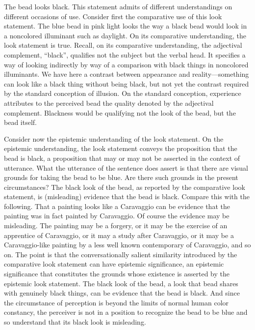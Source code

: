 \documentclass[12pt]{article}
\begin{document}

The bead looks black. This statement admits of different understandings on different occasions of use. Consider first the comparative use of this look statement. The blue bead in pink light looks the way a black bead would look in a noncolored illuminant such as daylight. On its comparative understanding, the look statement is true. Recall, on its comparative understanding, the adjectival complement, ``black'', qualifies not the subject but the verbal head. It specifies a way of looking indirectly by way of a comparison with black things in noncolored illuminants. We have here a contrast between appearance and reality---something can look like a black thing without being black, but not yet the contrast required by the standard conception of illusion. On the standard conception, experience attributes to the perceived bead the quality denoted by the adjectival complement. Blackness would be qualifying not the look of the bead, but the bead itself. 

Consider now the epistemic understanding of the look statement. On the epistemic understanding, the look statement conveys the proposition that the bead is black, a proposition that may or may not be asserted in the context of utterance. What the utterance of the sentence does assert is that there are visual grounds for taking the bead to be blue. Are there such grounds in the present circumstances? The black look of the bead, as reported by the comparative look statement, is (misleading) evidence that the bead is black. Compare this with the following. That a painting looks like a Caravaggio can be evidence that the painting was in fact painted by Caravaggio. Of course the evidence may be misleading. The painting may be a forgery, or it may be the exercise of an apprentice of Caravaggio, or it may a study after Caravaggio, or it may be a Caravaggio-like painting by a less well known contemporary of Caravaggio, and so on. The point is that the conversationally salient similarity introduced by the comparative look statement can have epistemic significance, an epistemic significance that constitutes the grounds whose existence is asserted by the epistemic look statement. The black look of the bead, a look that bead shares with genuinely black things, can be evidence that the bead is black. And since the circumstance of perception is beyond the limits of normal human color constancy, the perceiver is not in a position to recognize the bead to be blue and so understand that its black look is misleading. 
\end{document}
